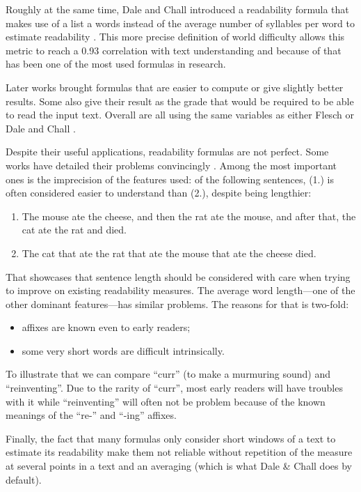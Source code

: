 \documentclass[a4paper, 11pt, onepage]{scrreprt}
\begin{document}
Roughly at the same time, Dale and Chall introduced a readability
formula that makes use of a list a words instead of the average number
of syllables per word to estimate readability
\cite{dale1948formula}. This more precise definition of world
difficulty allows this metric to reach a 0.93 correlation with text
understanding and because of that has been one of the most used
formulas in research.

Later works brought formulas that are easier to compute or give
slightly better results. Some also give their result as the grade that
would be required to be able to read the input text. Overall are all
using the same variables as either Flesch or Dale and Chall
\cite{mclaughlin1969smog, kincaid1975derivation,
  chall1995readability}.

Despite their useful applications, readability formulas are not
perfect. Some works have detailed their problems convincingly
\cite{duffy1985readability, schriver2000readability}. Among the most
important ones is the imprecision of the features used: of the
following sentences, (1.)  is often considered easier to understand
than (2.), despite being lengthier:
\begin{enumerate}
\item The mouse ate the cheese, and then the rat ate the mouse, and
  after that, the cat ate the rat and died.
\item The cat that ate the rat that ate the mouse that ate the cheese
  died.
\end{enumerate}
That showcases that sentence length should be considered with care
when trying to improve on existing readability measures. The average
word length—one of the other dominant features—has similar
problems. The reasons for that is two-fold:
\begin{itemize}
\item affixes are known even to early readers;
\item some very short words are difficult intrinsically.
\end{itemize}
To illustrate that we can compare “curr” (to make a murmuring sound)
and “reinventing”. Due to the rarity of “curr”, most early readers
will have troubles with it while “reinventing” will often not be
problem because of the known meanings of the “re-” and “-ing” affixes.

Finally, the fact that many formulas only consider short windows of a
text to estimate its readability make them not reliable without
repetition of the measure at several points in a text and an averaging
(which is what Dale \& Chall does by default).
\end{document}
